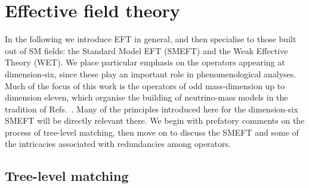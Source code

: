\section{Effective field theory}

In the following we introduce EFT in general, and then specialise to those built
out of SM fields: the Standard Model EFT (SMEFT) and the Weak Effective Theory
(WET). We place particular emphasis on the operators appearing at dimension-six,
since these play an important role in phenomenological analyses. Much of the
focus of this work is the operators of odd mass-dimension up to dimension
eleven, which organise the building of neutrino-mass models in the tradition of
Refs.~\cite{Babu:2001ex, deGouvea:2007qla, PhysRevD.87.073007, Cai:2014kra}.
Many of the principles introduced here for the dimension-six SMEFT will be
directly relevant there. We begin with prefatory comments on the process of
tree-level matching, then move on to discuss the SMEFT and some of the
intricacies associated with redundancies among operators.

\subsection{Tree-level matching}
\label{sec:ch1-tree-level-matching}


